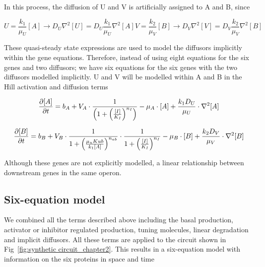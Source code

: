 In this process, the diffusion of U and V is artificially assigned to A and B, since

\begin{subequations}\label{[diffuser_artificial]}

\begin{equation}
    U = \frac{k_{1}}{\mu_{U}}[A] \longrightarrow D_{U}
    \nabla^2 [U] = D_{U}\frac{k_{1}}{\mu_{U}}  \nabla^2  [A]\label{eq:equation2}
\end{equation}

\begin{equation}
    V = \frac{k_{2}}{\mu_{V}}[B] \longrightarrow D_{V}
    \nabla^2 [V] =  D_{V}\frac{k_{2}}{\mu_{V}}  \nabla^2  [B]\label{eq:equation}
\end{equation}

\end{subequations}

These quasi-steady state expressions are used to model the diffusors implicitly within the gene equations.
Therefore, instead of using eight equations for the six genes and two diffusors;
we have six equations for the six genes with the two diffusors modelled implicitly.
U and V will be modelled within A and B in the Hill activation and diffusion terms

\begin{equation}
    \pdv{[A]}{t} = b_{A}+V_{A}\cdot \frac{1}{\left(1+\left(\frac{[I]}{K_{I}}\right)^{n_{I}}\right)}-\mu_{A}\cdot[A] + \frac{k_{1}D_{U}}{\mu_{U}}\cdot \nabla^2 [A]
\end{equation}

\begin{equation}
    \pdv{[B]}{t} = b_{B}+V_{B}\cdot\frac{1}{1+\left(\frac{\mu_{u}K{ub}}{k_{1}[A]}\right)^{n_{ab}}}\cdot\frac{1}{1+\left(\frac{[I]}{K_{I}}\right)^{n_{I}}}-\mu_{B}\cdot[B] + \frac{k_{2}D_{V}}{\mu_{V}}\cdot \nabla^2 [B]
\end{equation}

Although these genes are not explicitly modelled, a linear relationship between downstream genes in the same operon.

\subsection{Six-equation model}
We combined all the terms described above including the basal production,
activator or inhibitor regulated production, tuning molecules, linear degradation and implicit diffusors.
All these terms are applied to the circuit shown in Fig~\ref{fig:synthetic circuit_chapter2}.
This results in a six-equation model with information on the six proteins in space and time

